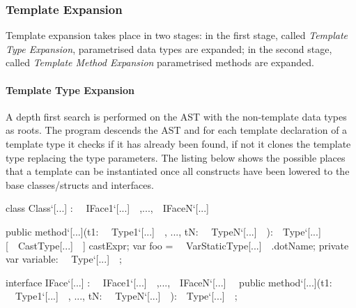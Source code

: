 \documentclass{article}
\begin{document}
\subsubsection{Template Expansion}
Template expansion takes place in two stages: in the first stage, called \textit{Template Type Expansion}, parametrised data types are expanded; in the second stage, called \textit{Template Method Expansion} parametrised methods are expanded. 

\paragraph{Template Type Expansion}
A depth first search is performed on the AST with the non-template data types as roots. The program descends the AST and for each template declaration of a template type it checks if it has already been found, if not it clones the template type replacing the type parameters. The listing below shows the possible places that a template can be instantiated once all constructs have been lowered to the base classes/structs and interfaces.
\begin{sooplisting}
class Class`[...] : ~~IFace1`[...]~~,...,~~IFaceN`[...]~~ {

	public method`[...](t1: ~~Type1`[...]~~, ..., tN: ~~TypeN`[...]~~):~~Type`[...]~~ {
		[~~CastType[...]~~] castExpr;
		var foo = ~~VarStaticType[...]~~.dotName;
	}	
	private var variable: ~~Type`[...]~~;
}

interface IFace`[...] : ~~IFace1`[...]~~,...,~~IFaceN`[...]~~ {
	public method`[...](t1: ~~Type1`[...]~~, ..., tN: ~~TypeN`[...]~~):~~Type`[...]~~;
}
\end{sooplisting}
\end{document}
